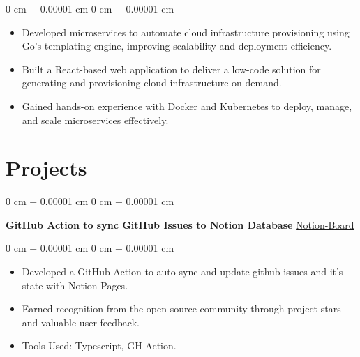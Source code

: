 \documentclass[10pt, letterpaper]{article}
\newenvironment{highlights}{
    \begin{itemize}[
        topsep=0.10 cm,
        parsep=0.10 cm,
        partopsep=0pt,
        itemsep=0pt,
        leftmargin=0 cm + 10pt
    ]
}{
    \end{itemize}
} %
\newenvironment{onecolentry}{
    \begin{adjustwidth}{
        0 cm + 0.00001 cm
    }{
        0 cm + 0.00001 cm
    }
}{
    \end{adjustwidth}
} %
\newenvironment{twocolentry}[2][]{
    \onecolentry
    \def\secondColumn{#2}
    \setcolumnwidth{\fill, 4.5 cm}
    \begin{paracol}{2}
}{
    \switchcolumn \raggedleft \secondColumn
    \end{paracol}
    \endonecolentry
} %
\begin{document}
        \vspace{0.10 cm}
        \begin{onecolentry}
            \begin{highlights}
                \item Developed microservices to automate cloud infrastructure provisioning using Go’s templating engine, improving scalability and deployment efficiency.

                \item Built a React-based web application to deliver a low-code solution for generating and provisioning cloud infrastructure on demand.

                \item Gained hands-on experience with Docker and Kubernetes to deploy, manage, and scale microservices effectively.
                
            \end{highlights}
        \end{onecolentry}
    
    \vspace {1 cm}
    
    \section{Projects}



        
        \begin{twocolentry}{
            \href{https://github.com/Souvikns/Notion-Board}{Notion-Board}
        }
            \textbf{GitHub Action to sync GitHub Issues to Notion Database}\end{twocolentry}

        \vspace{0.10 cm}
        \begin{onecolentry}
            \begin{highlights}
                \item Developed a GitHub Action to auto sync and update github issues and it's state with Notion Pages.
                \item Earned recognition from the open-source community through project stars and valuable user feedback.
                \item Tools Used: Typescript, GH Action.
                
            \end{highlights}
        \end{onecolentry}
\end{document}
